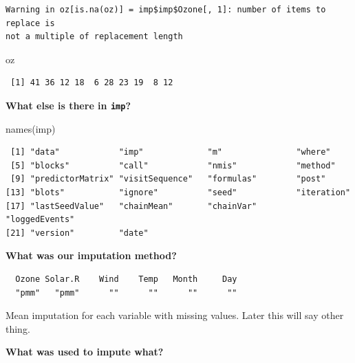 \documentclass[
  letterpaper,
  DIV=11,
  numbers=noendperiod]{scrreprt}
\newenvironment{Shaded}{}{}
\newcommand{\FunctionTok}[1]{\textcolor[rgb]{0.02,0.16,0.49}{#1}}
\newcommand{\NormalTok}[1]{#1}
\newcommand{\SpecialCharTok}[1]{\textcolor[rgb]{0.25,0.44,0.63}{#1}}
\begin{document}
\begin{verbatim}
Warning in oz[is.na(oz)] = imp$imp$Ozone[, 1]: number of items to replace is
not a multiple of replacement length
\end{verbatim}

\begin{Shaded}
\begin{Highlighting}[]
\NormalTok{  oz}
\end{Highlighting}
\end{Shaded}

\begin{verbatim}
 [1] 41 36 12 18  6 28 23 19  8 12
\end{verbatim}

\textbf{What else is there in \texttt{imp}?}

\begin{Shaded}
\begin{Highlighting}[]
  \FunctionTok{names}\NormalTok{(imp)}
\end{Highlighting}
\end{Shaded}

\begin{verbatim}
 [1] "data"            "imp"             "m"               "where"          
 [5] "blocks"          "call"            "nmis"            "method"         
 [9] "predictorMatrix" "visitSequence"   "formulas"        "post"           
[13] "blots"           "ignore"          "seed"            "iteration"      
[17] "lastSeedValue"   "chainMean"       "chainVar"        "loggedEvents"   
[21] "version"         "date"           
\end{verbatim}

\textbf{What was our imputation method?}

\begin{Shaded}
\end{Shaded}

\begin{verbatim}
  Ozone Solar.R    Wind    Temp   Month     Day 
  "pmm"   "pmm"      ""      ""      ""      "" 
\end{verbatim}

Mean imputation for each variable with missing values. Later this will
say other thing.

\textbf{What was used to impute what?}

\begin{Shaded}
\end{Shaded}
\end{document}
